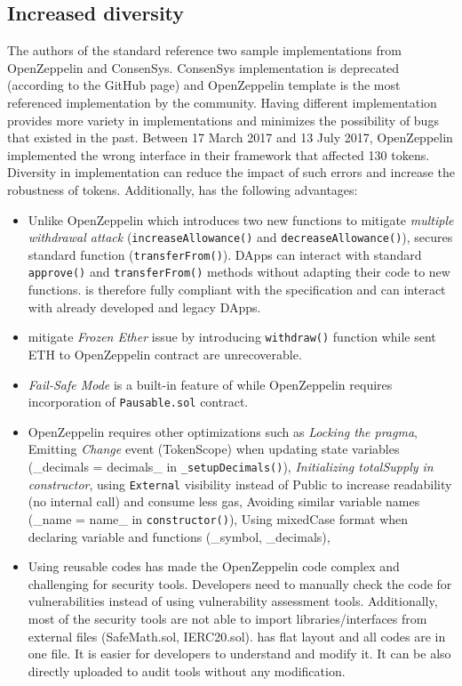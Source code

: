 {\subsection{Increased diversity}
The authors of the \erc standard reference two sample implementations from OpenZeppelin\cite{OpenZepplin} and ConsenSys\cite{ConsensysToken}. ConsenSys implementation is deprecated (according to the GitHub page) and OpenZeppelin template is the most referenced implementation by the community\cite{OPZ1,OPZ2,OPZ3}. Having different \erc implementation provides more variety in implementations and minimizes the possibility of bugs that existed in the past. Between 17 March 2017 and 13 July 2017, OpenZeppelin implemented the wrong interface in their framework that affected 130 tokens\cite{ErcBug}. Diversity in \erc implementation can reduce the impact of such errors and increase the robustness of \erc tokens. Additionally, \sys has the following advantages:
\begin{itemize}[noitemsep,topsep=0pt]
	\item Unlike OpenZeppelin which introduces two new functions to mitigate \textit{multiple withdrawal attack} (\ie \texttt{increaseAllowance()} and \texttt{decreaseAllowance()}), \sys secures standard \erc function (\ie \texttt{transferFrom()}). DApps can interact with standard \texttt{approve()} and \texttt{transferFrom()} methods without adapting their code to new functions. \sys is therefore fully compliant with the \erc specification and can interact with already developed and legacy DApps.
	\item \sys mitigate \textit{Frozen Ether} issue by introducing \texttt{withdraw()} function while sent ETH to OpenZeppelin contract are unrecoverable.
	\item \textit{Fail-Safe Mode} is a built-in feature of \sys while OpenZeppelin requires incorporation of \texttt{Pausable.sol} contract.
	\item OpenZeppelin requires other optimizations such as \textit{Locking the pragma}, Emitting \textit{Change} event (\cf TokenScope\cite{TokenScope}) when updating state variables (\eg \_decimals = decimals\_ in \texttt{\_setupDecimals()}), \textit{Initializing totalSupply in constructor}, using \texttt{External} visibility instead of Public to increase readability (\ie no internal call) and consume less gas, Avoiding similar variable names (\eg \_name = name\_ in \texttt{constructor()}), Using mixedCase format when declaring variable and functions (\eg \_symbol, \_decimals), \etc
	\item Using reusable codes has made the OpenZeppelin code complex and challenging for security tools. Developers need to manually check the code for vulnerabilities instead of using vulnerability assessment tools. Additionally, most of the security tools are not able to import libraries/interfaces from external files (\eg SafeMath.sol, IERC20.sol). \sys has flat layout and all codes are in one file. It is easier for developers to understand and modify it. It can be also directly uploaded to audit tools without any modification.
\end{itemize}

}

